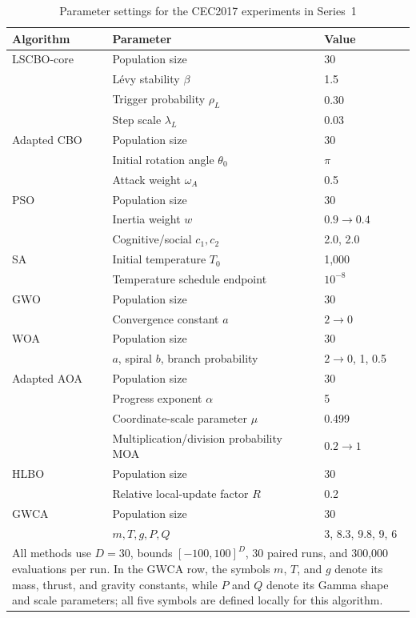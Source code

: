 \documentclass[pdflatex,onecolumn,sn-mathphys-num]{sn-jnl}
\begin{document}
\begin{table}[ht]
\centering
\caption{Parameter settings for the CEC2017 experiments in Series~1}\label{tab:param_cec}
\begin{tabular}{l l l}
\toprule
\textbf{Algorithm} & \textbf{Parameter} & \textbf{Value} \\
\midrule
LSCBO-core & Population size & 30 \\
       & L\'{e}vy stability $\beta$ & 1.5 \\
       & Trigger probability $\rho_L$ & 0.30 \\
       & Step scale $\lambda_L$ & 0.03 \\
\midrule
Adapted CBO & Population size & 30 \\
    & Initial rotation angle $\theta_0$ & $\pi$ \\
    & Attack weight $\omega_A$ & 0.5 \\
\midrule
PSO & Population size & 30 \\
    & Inertia weight $w$ & $0.9 \rightarrow 0.4$ \\
    & Cognitive/social $c_1, c_2$ & 2.0, 2.0 \\
\midrule
SA & Initial temperature $T_0$ & 1,000 \\
   & Temperature schedule endpoint & $10^{-8}$ \\
\midrule
GWO & Population size & 30 \\
    & Convergence constant $a$ & $2 \rightarrow 0$ \\
\midrule
WOA & Population size & 30 \\
    & $a$, spiral $b$, branch probability & $2\!\rightarrow\!0$, 1, 0.5 \\
\midrule
Adapted AOA & Population size & 30 \\
    & Progress exponent $\alpha$ & 5 \\
    & Coordinate-scale parameter $\mu$ & 0.499 \\
    & Multiplication/division probability MOA & $0.2\!\rightarrow\!1$ \\
\midrule
HLBO & Population size & 30 \\
     & Relative local-update factor $R$ & 0.2 \\
\midrule
GWCA & Population size & 30 \\
     & $m,T,g,P,Q$ & 3, 8.3, 9.8, 9, 6 \\
\midrule
\multicolumn{3}{p{.95\textwidth}}{\footnotesize All methods use $D=30$, bounds $[-100,100]^D$, 30 paired runs, and 300,000 evaluations per run. In the GWCA row, the symbols $m$, $T$, and $g$ denote its mass, thrust, and gravity constants, while $P$ and $Q$ denote its Gamma shape and scale parameters; all five symbols are defined locally for this algorithm.} \\
\bottomrule
\end{tabular}
\end{table}
\end{document}
